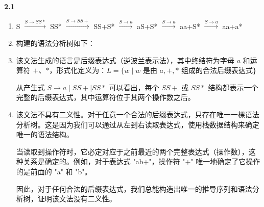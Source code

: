 \documentclass[UTF8]{report}
\newcommand{\tbf}[1]{\textbf{#1}}
\begin{document}
\pagestyle{fancy}

\maketitle

\noindent
\tbf{2.1}

\begin{enumerate}[label=(\arabic*)]
    \item S $\xrightarrow{S \rightarrow SS*}$ SS* $\xrightarrow{S \rightarrow SS+}$ SS+S* $\xrightarrow{S \rightarrow a}$ aS+S* $\xrightarrow{S \rightarrow a}$ aa+S* $\xrightarrow{S \rightarrow a}$ aa+a*
        
    \item 构建的语法分析树如下：


      \item 该文法生成的语言是后缀表达式（逆波兰表示法），其中终结符为字母 $a$ 和运算符 $+$、$*$，形式化定义为：$L = \{w \mid w \text{ 是由 } a, +, * \text{ 组成的合法后缀表达式}\}$
      
      从产生式 $S \rightarrow a \mid SS+ \mid SS*$ 可以看出，每个 $SS+$ 或 $SS*$ 结构都表示一个完整的后缀表达式，其中运算符位于其两个操作数之后。

      \item 该文法不具有二义性。对于任意一个合法的后缀表达式，只存在唯一一棵语法分析树。这是因为我们可以通过从左到右读取表达式，使用栈数据结构来确定唯一的语法结构。

      当读取到操作符时，它必定对应于之前最近的两个完整表达式（操作数），这种关系是确定的。例如，对于表达式 "ab+"，操作符 "+" 唯一地确定了它操作的是前面的 "a" 和 "b"。

      因此，对于任何合法的后缀表达式，我们总能构造出唯一的推导序列和语法分析树，证明该文法没有二义性。
\end{enumerate}
\end{document}
